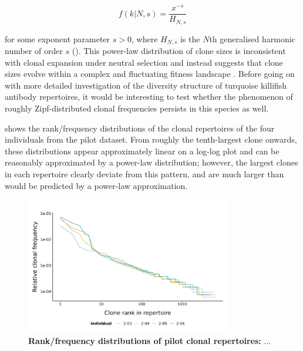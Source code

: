 \begin{equation}
f(k | N, s) = \frac{x^{-s}}{H_{N,s}}
\end{equation}

\noindent for some exponent parameter $s > 0$, where $H_{N,s}$ is the $N$th generalised harmonic number of order $s$ (). This power-law distribution of clone sizes is inconsistent with clonal expansion under neutral selection and instead suggests that clone sizes evolve within a complex and fluctuating fitness landscape \parencite{desponds2016fluctuating}. %
Before going on with more detailed investigation of the diversity structure of turquoise killifish antibody repertoires, it would be interesting to test whether the phenomenon of roughly Zipf-distributed clonal frequencies persists in this species as well.

 shows the rank/frequency distributions of the clonal repertoires of the four individuals from the pilot dataset. From roughly the tenth-largest clone onwards, these distributions appear approximately linear on a log-log plot and can be reasonably approximated by a power-law distribution; %
however, the largest clones in each repertoire clearly deviate from this pattern, and are much larger than would be predicted by a power-law approximation. %

\begin{figure}
\centering
\includegraphics[width=0.8\textwidth]{_Figures/png/pilot-clones-zipf-lines}
\caption[Rank/frequency distributions of pilot clonal repertoires]{\textbf{Rank/frequency distributions of pilot clonal repertoires:} ...}
\label{fig:igseq-pilot-clones-zipf-lines}
\end{figure}

